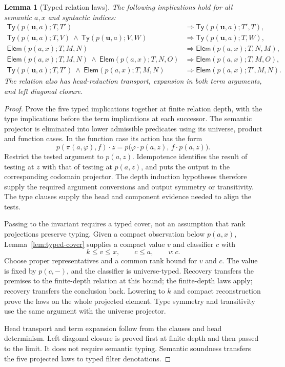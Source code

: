 \documentclass[11pt,a4paper]{article}
\newtheorem{lemma}[theorem]{Lemma}
\theoremstyle{definition}
\theoremstyle{remark}
\newcommand{\TyRel}{\mathsf{Ty}}
\newcommand{\ElemRel}{\mathsf{Elem}}
\newcommand{\appl}{\mathbin{\cdot}}
\begin{document}
\begin{lemma}[Typed relation laws]\label{lem:typed-laws}
The following implications hold for all semantic $a,x$ and syntactic
indices:
\begin{align*}
 \TyRel(p(\mathbf u,a);T,T')
  &\Longrightarrow\TyRel(p(\mathbf u,a);T',T),\\
 \TyRel(p(\mathbf u,a);T,V)\ \wedge\
 \TyRel(p(\mathbf u,a);V,W)
  &\Longrightarrow\TyRel(p(\mathbf u,a);T,W),\\
 \ElemRel(p(a,x);T,M,N)
  &\Longrightarrow\ElemRel(p(a,x);T,N,M),\\
 \ElemRel(p(a,x);T,M,N)\ \wedge\
 \ElemRel(p(a,x);T,N,O)
  &\Longrightarrow\ElemRel(p(a,x);T,M,O),\\
 \TyRel(p(\mathbf u,a);T,T')\ \wedge\
 \ElemRel(p(a,x);T,M,N)
  &\Longrightarrow\ElemRel(p(a,x);T',M,N).
\end{align*}
The relation also has head-reduction transport, expansion in both term
arguments, and left diagonal closure.
\end{lemma}
\begin{proof}
Prove the five typed implications together at finite relation depth,
with the type implications before the term implications at each
successor. The semantic projector is eliminated into lower admissible
predicates using its universe, product and function cases. In the
function case its action has the form
\[
 p(\pi(a,\varphi),f)\appl z
  =p\bigl(\varphi\appl p(a,z),\,f\appl p(a,z)\bigr).
\]
Restrict the tested argument to $p(a,z)$. Idempotence identifies the
result of testing at $z$ with that of testing at $p(a,z)$, and puts
the output in the corresponding codomain projector. The depth induction
hypotheses therefore supply the required argument conversions and output
symmetry or transitivity. The type clauses supply the head and component
evidence needed to align the tests.

Passing to the invariant requires a typed cover, not an assumption that
rank projections preserve typing. Given a compact observation below
$p(a,x)$, Lemma~\ref{lem:typed-cover} supplies a compact value $v$
and classifier $c$ with
\[
 k\leq v\leq x,\qquad c\leq a,\qquad v:c.
\]
Choose proper representatives and a common rank bound for $v$ and $c$.
The value is fixed by $p(c,-)$, and the classifier is universe-typed.
Recovery transfers the premises to the finite-depth relation at this
bound; the finite-depth laws apply; recovery transfers the conclusion
back. Lowering to $k$ and compact reconstruction prove the laws on the
whole projected element. Type symmetry and transitivity use the same
argument with the universe projector.

Head transport and term expansion follow from the clauses and head
determinism. Left diagonal closure is proved first at finite depth and
then passed to the limit. It does not require semantic typing. Semantic
soundness transfers the five projected laws to typed filter denotations.
\end{proof}
\end{document}

